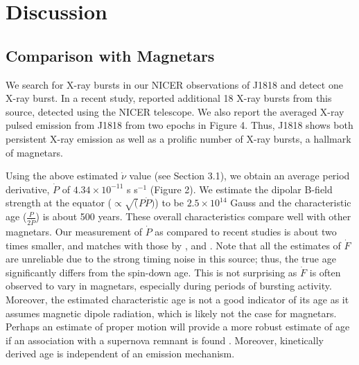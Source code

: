 \documentclass[twocolumn]{emulateapj}
\begin{document}
\section{Discussion}

\subsection{Comparison with Magnetars}



We search for X-ray bursts in our NICER observations of J1818 and detect one X-ray burst. In a recent study, \cite{hu2020} reported additional 18 X-ray bursts from this source, detected using the NICER telescope. We also report the averaged X-ray pulsed emission from J1818 from two epochs in Figure 4. Thus, J1818 shows both persistent X-ray emission as well as a prolific number of X-ray bursts, a hallmark of magnetars.

Using the above estimated $\dot{\nu}$ value (see Section 3.1), we obtain an average period derivative, $\dot{P}$ of $4.34 \times 10^{-11}$ s s$^{-1}$ (Figure 2). We estimate the dipolar B-field strength at the equator ($\propto \sqrt(P \dot{P})$) to be $2.5 \times 10^{14}$ Gauss and the characteristic age ($\frac{P}{2\dot{P}}$) is about 500 years. These overall characteristics compare well with other magnetars. Our measurement of $\dot{P}$ as compared to recent studies \citep{esposito20, lower2020} is about two times smaller, and matches with those by \cite{Champion_2020, hu2020}, and \cite{Huang2021}. Note that all the estimates of $\dot{F}$ are unreliable due to the strong timing noise in this source; thus, the true age significantly differs from the spin-down age. This is not surprising as $\dot{F}$ is often observed to vary in magnetars, especially during periods of bursting activity. Moreover, the estimated characteristic age is not a good indicator of its age as it assumes magnetic dipole radiation, which is likely not the case for magnetars. Perhaps an estimate of proper motion will provide a more robust estimate of age if an association with a supernova remnant is found \citep{blumer2020,lower2020, Gaensler2000}. Moreover, kinetically derived age is independent of an emission mechanism.  
\end{document}
